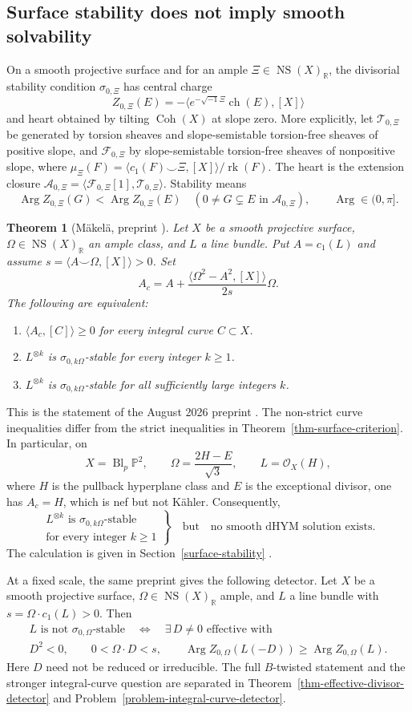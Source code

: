 \documentclass[12pt,reqno]{amsart}
\numberwithin{equation}{section}
\theoremstyle{plain}
\newtheorem{theorem}{Theorem}[section]
\theoremstyle{definition}
\newcommand{\R}{\mathbb R}
\newcommand{\bbP}{\mathbb P}
\DeclareMathOperator{\NS}{NS}
\newcommand{\SurfaceStabilityStatement}{%
Let $X$ be a smooth projective surface, $\Omega\in\NS(X)_\R$ an ample
class, and $L$ a line bundle. Put $A=c_1(L)$ and assume
$s=\langle A\smile\Omega,[X]\rangle>0$. Set
\[
 A_c=A+\frac{\langle\Omega^2-A^2,[X]\rangle}{2s}\Omega.
\]
The following are equivalent:
\begin{enumerate}
\item $\langle A_c,[C]\rangle\geq0$ for every integral curve $C\subset X$.
\item $L^{\otimes k}$ is $\sigma_{0,k\Omega}$-stable for every integer $k\geq1$.
\item $L^{\otimes k}$ is $\sigma_{0,k\Omega}$-stable for all sufficiently
large integers $k$.
\end{enumerate}
}
\begin{document}
\subsection{Surface stability does not imply smooth solvability}
\label{intro-surface-stability}
On a smooth projective surface and for an ample
$\Xi\in\NS(X)_\R$, the divisorial stability condition $\sigma_{0,\Xi}$
has central charge
\[
 Z_{0,\Xi}(E)=-\big\langle e^{-\sqrt{-1}\Xi}\operatorname{ch}(E),[X]\big\rangle
\]
and heart obtained by tilting $\operatorname{Coh}(X)$ at slope zero.
More explicitly, let $\mathcal T_{0,\Xi}$ be generated by torsion sheaves
and slope-semistable torsion-free sheaves of positive slope, and
$\mathcal F_{0,\Xi}$ by slope-semistable torsion-free sheaves of
nonpositive slope, where
$\mu_\Xi(F)=\langle c_1(F)\smile\Xi,[X]\rangle/\operatorname{rk}(F)$.
The heart is the extension closure
$\mathcal A_{0,\Xi}=\langle\mathcal F_{0,\Xi}[1],\mathcal T_{0,\Xi}\rangle$.
Stability means
\[
 \operatorname{Arg}Z_{0,\Xi}(G)<\operatorname{Arg}Z_{0,\Xi}(E)
 \quad(0\ne G\subsetneq E\text{ in }\mathcal A_{0,\Xi}),
 \qquad\operatorname{Arg}\in(0,\pi].
\]
\begin{theorem}[M\"akel\"a, preprint {\cite[Corollary 1.5]{Mak26}}]
\label{thm-stability-under-scaling}
\SurfaceStabilityStatement
\end{theorem}
This is the statement of the August 2026 preprint \cite{Mak26}.
The non-strict curve inequalities differ from the strict inequalities
in Theorem~\ref{thm-surface-criterion}. In particular, on
\[
 X=\operatorname{Bl}_p\bbP^2,\qquad
 \Omega=\frac{2H-E}{\sqrt3},\qquad L=\mathcal O_X(H),
\]
where $H$ is the pullback hyperplane class and $E$ is the exceptional
divisor, one has $A_c=H$, which is nef but not K\"ahler. Consequently,
\[
 \left.
 \begin{array}{c}
 L^{\otimes k}\text{ is }\sigma_{0,k\Omega}\text{-stable}\\
 \text{for every integer }k\geq1
 \end{array}\right\}\quad\text{but}\quad
 \text{no smooth dHYM solution exists}.
\]
The calculation is given in Section~\ref{surface-stability}
\cite[Example 2.11]{Fan26}.

At a fixed scale, the same preprint \cite[Theorem 1.1(a)]{Mak26}
gives the following detector. Let $X$ be a smooth projective surface,
$\Omega\in\NS(X)_\R$ ample, and $L$ a line bundle with
$s=\Omega\cdot c_1(L)>0$. Then
\begin{equation}\label{intro-divisor-detector}
 \begin{gathered}
 L\text{ is not }\sigma_{0,\Omega}\text{-stable}
 \quad\Longleftrightarrow\quad
 \exists\,D\ne0\text{ effective with}\\
 D^2<0,\qquad 0<\Omega\cdot D<s,\qquad
 \operatorname{Arg}Z_{0,\Omega}(L(-D))
 \geq\operatorname{Arg}Z_{0,\Omega}(L).
 \end{gathered}
\end{equation}
Here $D$ need not be reduced or irreducible. The full $B$-twisted
statement and the stronger integral-curve question are separated in
Theorem~\ref{thm-effective-divisor-detector} and
Problem~\ref{problem-integral-curve-detector}.
\end{document}
